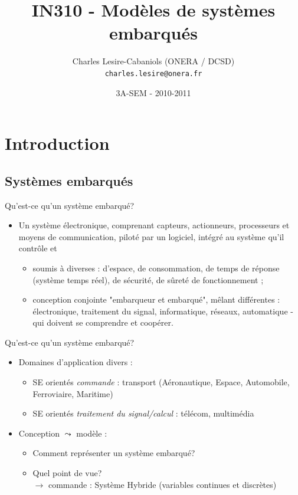 \documentclass[compress]{beamer}
\title[SEM IN310 - MSE]{IN310 - Modèles de systèmes embarqués}
\author[Charles Lesire]{Charles Lesire-Cabaniols (ONERA / DCSD)\\{\tt charles.lesire@onera.fr}}
\date[2010-2011]{3A-SEM - 2010-2011}
\begin{document}
\begin{frame}
\titlepage
\end{frame}

\begin{frame}
\tableofcontents%
\end{frame}

\section{Introduction}
\subsection{Systèmes embarqués}
\begin{frame}{Qu'est-ce qu'un système embarqué?}
\begin{itemize}
\item Un système électronique, comprenant capteurs, actionneurs, processeurs et moyens de communication, piloté par un logiciel, intégré au système qu'il contrôle et  
	\begin{itemize}
	\item soumis à diverses  : d'espace, de consommation, de temps de réponse (système temps réel), de sécurité, de  sûreté de fonctionnement ;
	\item conception conjointe "embarqueur et embarqué", mêlant différentes    : électronique, traitement du signal, informatique, réseaux, automatique - qui doivent se comprendre et coopérer.
	\end{itemize}
\end{itemize}	
\end{frame}
 
\begin{frame}{Qu'est-ce qu'un système embarqué?}
\begin{itemize}
\item Domaines d'application divers :
	\begin{itemize}
	\item SE orientés {\it commande} : transport (Aéronautique, Espace, Automobile, Ferroviaire, Maritime)
	\item SE orientés {\it traitement du signal/calcul} : télécom, multimédia
	\end{itemize}
\item Conception $\leadsto$ modèle :
	\begin{itemize}
	\item Comment représenter un système embarqué?
	\item Quel point de vue?\\
	$\rightarrow$ commande : Système Hybride (variables continues et discrètes)
	\end{itemize}
\end{itemize}
\end{frame}
\end{document}
